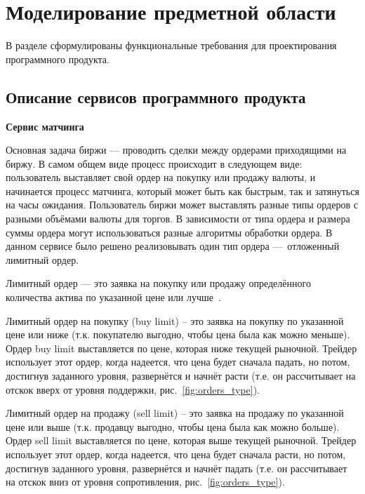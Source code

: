 \section{Моделирование предметной области}\label{sec:domain}

В разделе сформулированы функциональные требования для проектирования программного продукта.

\subsection{Описание сервисов программного продукта}\label{sec:domain:service}

\textbf{Сервис матчинга}

Основная задача биржи — проводить сделки между ордерами приходящими на биржу. В самом общем виде процесс происходит в следующем виде: пользователь выставляет свой ордер на покупку или продажу валюты, и начинается процесс матчинга, который может быть как быстрым, так и затянуться на часы ожидания. Пользователь биржи может выставлять разные типы ордеров с разными объёмами валюты для торгов. В зависимости от типа ордера и размера суммы ордера могут использоваться разные алгоритмы обработки ордера. В данном сервисе было решено реализовывать один тип ордера — отложенный лимитный ордер.

Лимитный ордер — это заявка на покупку или продажу определённого количества актива по указанной цене или лучше~\cite{limit_order}.

Лимитный ордер на покупку (buy limit) – это заявка на покупку по указанной цене или ниже (т.к. покупателю выгодно, чтобы цена была как можно меньше). Ордер buy limit выставляется по цене, которая ниже текущей рыночной. Трейдер использует этот ордер, когда надеется, что цена будет сначала падать, но потом, достигнув заданного уровня, развернётся и начнёт расти (т.е. он рассчитывает на отскок вверх от уровня поддержки, рис.~\ref{fig:orders_type}).

Лимитный ордер на продажу (sell limit) – это заявка на продажу по указанной цене или выше (т.к. продавцу выгодно, чтобы цена была как можно больше). Ордер sell limit выставляется по цене, которая выше текущей рыночной. Трейдер использует этот ордер, когда надеется, что цена будет сначала расти, но потом, достигнув заданного уровня, развернётся и начнёт падать (т.е. он рассчитывает на отскок вниз от уровня сопротивления, рис.~\ref{fig:orders_type}).

